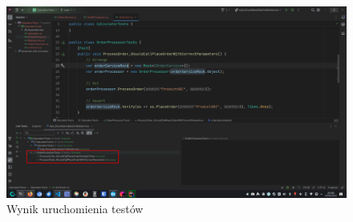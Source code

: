 \documentclass[12pt]{article}
\begin{document}
\begin{figure}[H]
  \centering
  \includegraphics[width=1\textwidth,keepaspectratio]{image-27.png}
  \caption{Wynik uruchomienia testów}
  \label{fig:image-27}
\end{figure}
\end{document}
